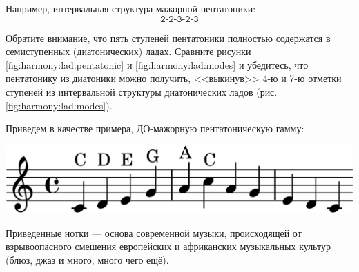 Например, интервальная структура мажорной пентатоники:
\[
    \texttt{2-2-3-2-3}
\]

Обратите внимание, что пять ступеней пентатоники полностью содержатся в семиступенных (диатонических) ладах. Сравните рисунки \ref{fig:harmony:lad:pentatonic} и \ref{fig:harmony:lad:modes} и убедитесь, что пентатонику из диатоники можно получить, <<выкинув>> 4-ю и 7-ю отметки ступеней из интервальной структуры диатонических ладов (рис. \ref{fig:harmony:lad:modes}).

Приведем в качестве примера, ДО-мажорную пентатоническую гамму:
\begin{center}    
    \includegraphics{fig/notes/scale-penta-c-maj}
\end{center}    

Приведенные нотки --- основа современной музыки, происходящей от взрывоопасного смешения европейских и африканских музыкальных культур (блюз, джаз и много, много чего ещё).